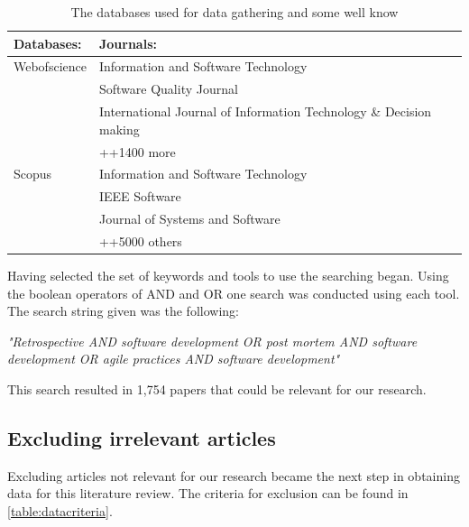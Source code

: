 \documentclass[12pt]{article}
\begin{document}
\begin{table}[!h]
	\begin{center}
		\caption{The databases used for data gathering and some well know}
		\label{table:tools}
		\begin{tabular}{ l | p{}}
			Databases: & Journals: \\ \hline
			Webofscience & Information and Software Technology \\ 
			& Software Quality Journal \\
			& International Journal of Information Technology \& Decision making \\
			& ++1400 more \\
			\hline
			Scopus & Information and Software Technology \\ 
			& IEEE Software\\
			& Journal of Systems and Software \\
			& ++5000 others \\
		\end{tabular}
	\end{center}
\end{table}
			
Having selected the set of keywords and tools to use the searching began. Using the boolean operators of AND and OR one search was conducted using each tool. The search string given was the following: 
\begin{center}
	\emph{"Retrospective AND software development OR post mortem AND software development OR agile practices AND software development"}
\end{center}
This search resulted in 1,754 papers that could be relevant for our research.

\subsection{Excluding irrelevant articles}
Excluding articles not relevant for our research became the next step in obtaining data for this literature review. The criteria for exclusion can be found in \autoref{table:datacriteria}. \\
\end{document}
